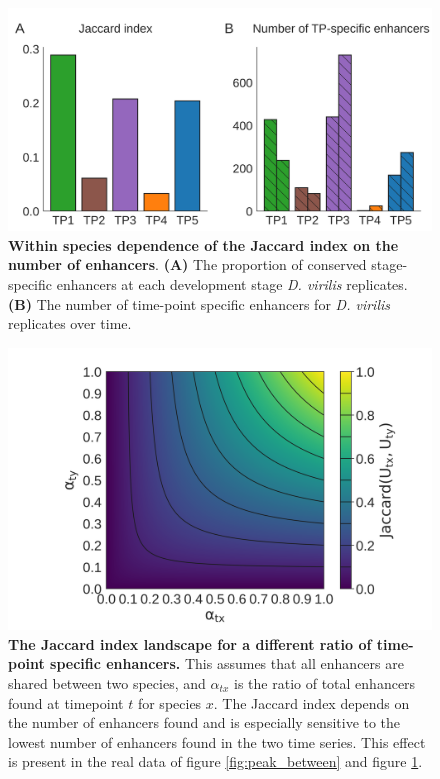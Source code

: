 \begin{figure}[H]
    \includegraphics[width=0.9\linewidth]{ch.hourglass/images/enhancers_within.png}
    \caption{\textbf{Within species dependence of the Jaccard index on the number of enhancers}. \textbf{(A)} The proportion of conserved stage-specific enhancers at each development stage \textit{D. virilis} replicates. \textbf{(B)} The number of time-point specific enhancers for \textit{D. virilis} replicates over time. }
    \label{fig:peak_within}
\end{figure}

\begin{figure}[H]
    \center
    \includegraphics[width=0.7\linewidth]{ch.hourglass/images/math_flies.png}
    \caption{\textbf{The Jaccard index landscape for a different ratio of time-point specific enhancers.} This assumes that all enhancers are shared between two species, and $\alpha_{tx}$ is the ratio of total enhancers found at timepoint $t$ for species $x$. The Jaccard index depends on the number of enhancers found and is especially sensitive to the lowest number of enhancers found in the two time series. This effect is present in the real data of figure \ref{fig:peak_between} and figure \ref{fig:peak_within}. }
    \label{fig:peak_math}
\end{figure}

